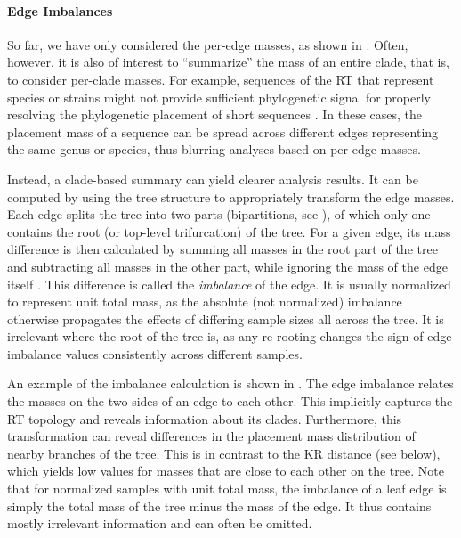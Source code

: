 \paragraph{Edge Imbalances}
\label{ch:Foundations:sec:PhylogeneticPlacement:sub:PlacementProcessing:par:EdgeImbalances}

So far, we have only considered the per-edge masses, as shown in .
Often, however, it is also of interest to ``summarize'' the mass of an entire clade, that is, to consider per-clade masses.
For example, sequences of the \ac{RT} that represent species or strains might not provide sufficient phylogenetic signal
for properly resolving the phylogenetic placement of short sequences \cite{Dunthorn2014}.
In these cases, the placement mass of a sequence can be spread across different edges representing the same genus or species,
thus blurring analyses based on per-edge masses.

Instead, a clade-based summary can yield clearer analysis results.
It can be computed by using the tree structure to appropriately transform the edge masses.
Each edge splits the tree into two parts
(bipartitions, see ),
of which only one contains the root (or top-level trifurcation) of the tree.
For a given edge, its mass difference is then calculated by summing all masses in the root part of the tree
and subtracting all masses in the other part,
while ignoring the mass of the edge itself \cite{Matsen2011a}.
This difference is called the \emph{imbalance} of the edge.
It is usually normalized to represent unit total mass,
as the absolute (not normalized) imbalance otherwise propagates the effects of differing sample sizes all across the tree.
It is irrelevant where the root of the tree is,
as any re-rooting changes the sign of edge imbalance values consistently across different samples.

An example of the imbalance calculation is shown in .
The edge imbalance relates the masses on the two sides of an edge to each other.
This implicitly captures the \ac{RT} topology and reveals information about its clades.
Furthermore, this transformation can reveal differences in the placement mass distribution
of nearby branches of the tree.
This is in contrast to the KR distance (see  below),
which yields low values for masses that are close to each other on the tree.
Note that for normalized samples with unit total mass,
the imbalance of a leaf edge is simply the total mass of the tree minus the mass of the edge.
It thus contains mostly irrelevant information and can often be omitted.

